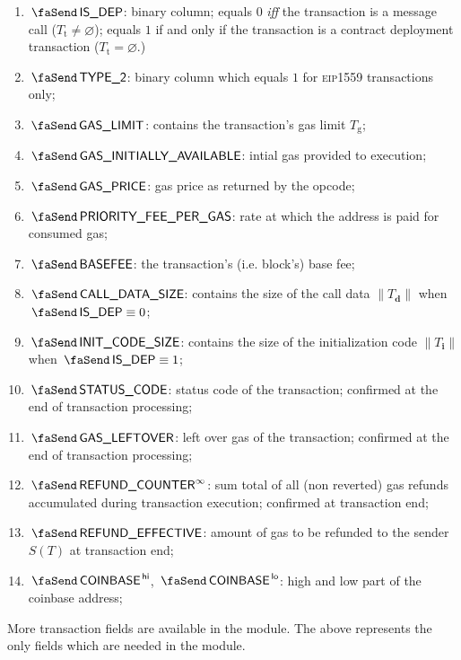 \begin{enumerate}
	\item
		\godGiven{}
		$\txIsDeployment$:
		binary column; equals $0$ \emph{iff} the transaction is a message call ($T_\text{t} \neq \varnothing$); equals $1$ if and only if the transaction is a contract deployment transaction ($T_{\text{t}} = \varnothing$.)
	\item
		\godGiven{}
		$\txIsTypeTwo$:
		binary column which equals $1$ for \textsc{eip1559} transactions only;
	\item
		\godGiven{}
		$\txGasLimit$:
		contains the transaction's gas limit $T_\text{g}$;
	\item
		\godGiven{}
		$\txInitialGas$:
		intial gas provided to execution;
	\item
		\godGiven{}
		$\txGasPrice$:
		gas price as returned by the  opcode;
	\item
		\godGiven{}
		$\txPriorityFeePerGas$:
		rate at which the  address is paid for consumed gas;
	\item
		\godGiven{}
		$\txBasefee$:
		the transaction's (i.e. block's) base fee;
	\item
		\godGiven{}
		$\txCallDataSize$:
		contains the size of the call data $\|T_\textbf{d}\|$ when $\txIsDeployment \equiv 0$;
	\item
		\godGiven{}
		$\txInitCodeSize$:
		contains the size of the initialization code $\|T_\textbf{i}\|$ when $\txIsDeployment \equiv 1$;
	\item
		\godGiven{}
		\markAsJustifiedHere{}
		$\txStatusCode$:
		status code of the transaction; confirmed at the end of transaction processing;
	\item
		\godGiven{}
		\markAsJustifiedHere{}
		$\txLeftoverGas$:
		left over gas of the transaction; confirmed at the end of transaction processing;
	\item
		\godGiven{}
		\markAsJustifiedHere{}
		$\txFinalRefundCounter$:
		sum total of all (non reverted) gas refunds accumulated during transaction execution; confirmed at transaction end;
	\item
		\godGiven{}
		$\txEffectiveRefund$:
		amount of gas to be refunded to the sender $S(T)$ at transaction end;
	\item
		\godGiven{}
		$\txCoinbase\high$, $\txCoinbase\low$:
		high and low part of the coinbase address;
\end{enumerate}
\saNote{}
More transaction fields are available in the \txnDataMod{} module. The above represents the only fields which are needed in the \hubMod{} module.

